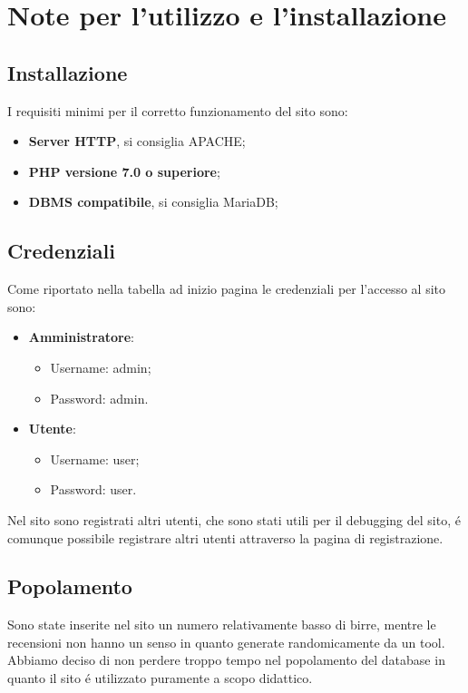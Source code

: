\section*{Note per l'utilizzo e l'installazione}
\subsection{Installazione}
I requisiti minimi per il corretto funzionamento del sito sono:
\begin{itemize}
\item \textbf{Server HTTP}, si consiglia APACHE;
\item \textbf{PHP versione 7.0 o superiore};
\item \textbf{DBMS compatibile}, si consiglia MariaDB;
\end{itemize}
\subsection{Credenziali}
Come riportato nella tabella ad inizio pagina le credenziali per l'accesso al sito sono:
\begin{itemize}
\item \textbf{Amministratore}:
	\begin{itemize}
		\item Username: admin;
		\item Password: admin.
	\end{itemize}

\item \textbf{Utente}:
	\begin{itemize}
		\item Username: user;
		\item Password: user.
	\end{itemize}
\end{itemize}
Nel sito sono registrati altri utenti, che sono stati utili per il debugging del sito, é comunque possibile registrare altri utenti attraverso la pagina di registrazione.
\subsection{Popolamento}
Sono state inserite nel sito un numero relativamente basso di birre, mentre le recensioni non hanno un senso in quanto generate randomicamente da un tool. Abbiamo deciso di non perdere troppo tempo nel popolamento del database in quanto il sito é utilizzato puramente a scopo didattico.